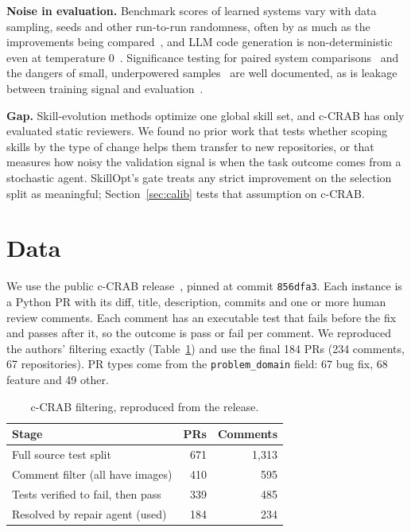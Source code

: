\documentclass[sigconf, authorversion, nonacm]{acmart}
\begin{document}
\textbf{Noise in evaluation.} Benchmark scores of learned systems vary with data sampling, seeds and other run-to-run randomness, often by as much as the improvements being compared~\cite{bouthillier2021variance}, and LLM code generation is non-deterministic even at temperature 0~\cite{ouyang2023nondeterminism}. Significance testing for paired system comparisons~\cite{dror2018hitchhiker} and the dangers of small, underpowered samples~\cite{button2013power} are well documented, as is leakage between training signal and evaluation~\cite{kapoor2023leakage}.

\textbf{Gap.} Skill-evolution methods optimize one global skill set, and c-CRAB has only evaluated static reviewers. We found no prior work that tests whether scoping skills by the type of change helps them transfer to new repositories, or that measures how noisy the validation signal is when the task outcome comes from a stochastic agent. SkillOpt's gate treats any strict improvement on the selection split as meaningful; Section~\ref{sec:calib} tests that assumption on c-CRAB.

\section{Data}
We use the public c-CRAB release~\cite{zhang2026ccrab}, pinned at commit \texttt{856dfa3}. Each instance is a Python PR with its diff, title, description, commits and one or more human review comments. Each comment has an executable test that fails before the fix and passes after it, so the outcome is pass or fail per comment. We reproduced the authors' filtering exactly (Table~\ref{tab:funnel}) and use the final 184 PRs (234 comments, 67 repositories). PR types come from the \texttt{problem\_domain} field: 67 bug fix, 68 feature and 49 other.

\begin{table}[t]
\caption{c-CRAB filtering, reproduced from the release.}
\label{tab:funnel}
\small
\begin{tabular}{lrr}
\toprule
Stage & PRs & Comments \\
\midrule
Full source test split & 671 & 1,313 \\
Comment filter (all have images) & 410 & 595 \\
Tests verified to fail, then pass & 339 & 485 \\
Resolved by repair agent (used) & 184 & 234 \\
\bottomrule
\end{tabular}
\end{table}
\end{document}
